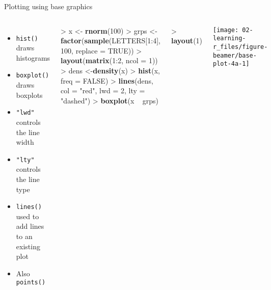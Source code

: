 \documentclass[10pt,ignorenonframetext,compress, aspectratio=169]{beamer}
\newenvironment{Shaded}{\begin{snugshade}}{\end{snugshade}}
\newcommand{\KeywordTok}[1]{\textcolor[rgb]{0.13,0.29,0.53}{\textbf{{#1}}}}
\newcommand{\DataTypeTok}[1]{\textcolor[rgb]{0.13,0.29,0.53}{{#1}}}
\newcommand{\DecValTok}[1]{\textcolor[rgb]{0.00,0.00,0.81}{{#1}}}
\newcommand{\StringTok}[1]{\textcolor[rgb]{0.31,0.60,0.02}{{#1}}}
\newcommand{\OtherTok}[1]{\textcolor[rgb]{0.56,0.35,0.01}{{#1}}}
\newcommand{\NormalTok}[1]{{#1}}
\providecommand{\tightlist}{%
  \setlength{\itemsep}{0pt}\setlength{\parskip}{0pt}}
\newcommand{\columnsbegin}{\begin{columns}}
\newcommand{\columnsend}{\end{columns}}
\begin{document}
\begin{frame}[fragile]{Plotting using base graphics}

\columnsbegin
{}

\begin{itemize}
\tightlist
\item
  \texttt{hist()} draws histograms
\item
  \texttt{boxplot()} draws boxplots
\item
  \texttt{"lwd"} controls the line width
\item
  \texttt{"lty"} controls the line type
\item
  \texttt{lines()} used to add lines to an existing plot
\item
  Also \texttt{points()}
\end{itemize}

\begin{Shaded}
\begin{Highlighting}[]
\NormalTok{>}\StringTok{ }\NormalTok{x <-}\StringTok{ }\KeywordTok{rnorm}\NormalTok{(}\DecValTok{100}\NormalTok{)}
\NormalTok{>}\StringTok{ }\NormalTok{grps <-}\StringTok{ }\KeywordTok{factor}\NormalTok{(}\KeywordTok{sample}\NormalTok{(LETTERS[}\DecValTok{1}\NormalTok{:}\DecValTok{4}\NormalTok{], }\DecValTok{100}\NormalTok{, }\DataTypeTok{replace =} \OtherTok{TRUE}\NormalTok{))}
\NormalTok{>}\StringTok{ }\KeywordTok{layout}\NormalTok{(}\KeywordTok{matrix}\NormalTok{(}\DecValTok{1}\NormalTok{:}\DecValTok{2}\NormalTok{, }\DataTypeTok{ncol =} \DecValTok{1}\NormalTok{))}
\NormalTok{>}\StringTok{ }\NormalTok{dens <-}\KeywordTok{density}\NormalTok{(x)}
\NormalTok{>}\StringTok{ }\KeywordTok{hist}\NormalTok{(x, }\DataTypeTok{freq =} \OtherTok{FALSE}\NormalTok{)}
\NormalTok{>}\StringTok{ }\KeywordTok{lines}\NormalTok{(dens, }\DataTypeTok{col =} \StringTok{"red"}\NormalTok{, }\DataTypeTok{lwd =} \DecValTok{2}\NormalTok{, }\DataTypeTok{lty =} \StringTok{"dashed"}\NormalTok{)}
\NormalTok{>}\StringTok{ }\KeywordTok{boxplot}\NormalTok{(x ~}\StringTok{ }\NormalTok{grps)}
\end{Highlighting}
\end{Shaded}

\begin{Shaded}
\begin{Highlighting}[]
\NormalTok{>}\StringTok{ }\KeywordTok{layout}\NormalTok{(}\DecValTok{1}\NormalTok{)}
\end{Highlighting}
\end{Shaded}


\begin{center}\texttt{[image: 02-learning-r\_files/figure-beamer/base-plot-4a-1]} \end{center}

\columnsend

\end{frame}
\end{document}
